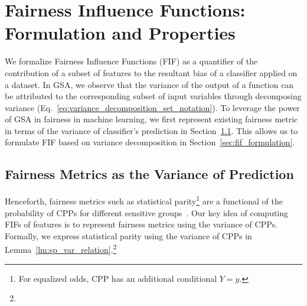\section{Fairness Influence Functions: Formulation and Properties}\label{sec:fifs}
We formalize Fairness Influence Functions (FIF) as a quantifier of the contribution of a subset of features to the resultant bias of a classifier applied on a dataset.  In GSA, we observe that the variance of the output of a function can be attributed to the corresponding subset of input variables through decomposing variance (Eq.~\eqref{eq:variance_decomposition_set_notation}). To leverage the power of GSA in fairness in machine learning, we first represent existing fairness metric in terms of the variance of classifier's prediction in Section~\ref{sec:metric_as_variance}. This allows us to formulate FIF based on variance decomposition in Section~\ref{sec:fif_formulation}. 





\subsection{Fairness Metrics as the Variance of Prediction}
\label{sec:metric_as_variance}
 Henceforth, fairness metrics such as statistical parity\footnote{For equalized odds, CPP has an additional conditional $ Y = y $.} are a functional of the probability of CPPs for different sensitive groups~\cite{ghosh2020justicia,benesse2021fairness}.
Our key idea of computing FIFs of features is to represent fairness metrics using the variance of CPPs. 
Formally, we express statistical parity using the variance of CPPs in Lemma~\ref{lm:sp_var_relation}.\footnote{}

